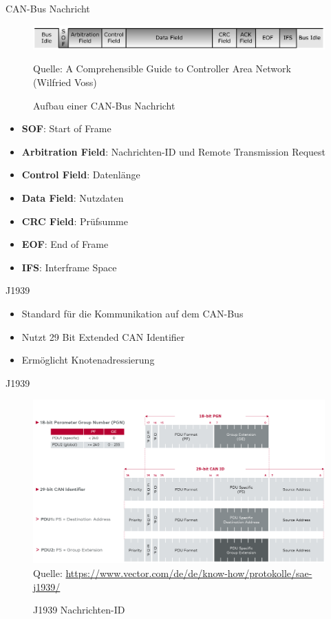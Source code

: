 \documentclass[usenames, dvipsnames, aspectratio=75]{beamer}
\begin{document}
\begin{frame}{CAN-Bus Nachricht}
    \begin{figure}
        \centering
        \includegraphics[width=0.9\linewidth]{assets/canMessage.png}
        \captionsetup{skip=0pt}
        \caption*{\tiny{Quelle: A Comprehensible Guide to Controller Area Network (Wilfried Voss)}}
        \caption{Aufbau einer CAN-Bus Nachricht}
    \end{figure}
    \begin{itemize}
        \item \textbf{SOF}: Start of Frame
        \item \textbf{Arbitration Field}: Nachrichten-ID und Remote Transmission Request
        \item \textbf{Control Field}: Datenlänge
        \item \textbf{Data Field}: Nutzdaten
        \item \textbf{CRC Field}: Prüfsumme
        \item \textbf{EOF}: End of Frame
        \item \textbf{IFS}: Interframe Space
    \end{itemize}
\end{frame}

\begin{frame}{J1939}
    \begin{itemize}
        \item Standard für die Kommunikation auf dem CAN-Bus
        \item Nutzt 29 Bit Extended CAN Identifier
        \item Ermöglicht Knotenadressierung
    \end{itemize}
\end{frame}

\begin{frame}{J1939}
    \begin{figure}
        \centering
        \includegraphics[width=1\linewidth]{assets/j1939id.png}
        \tiny{Quelle: \url{https://www.vector.com/de/de/know-how/protokolle/sae-j1939/}}
        \caption{J1939 Nachrichten-ID}
    \end{figure}
\end{frame}
\end{document}
